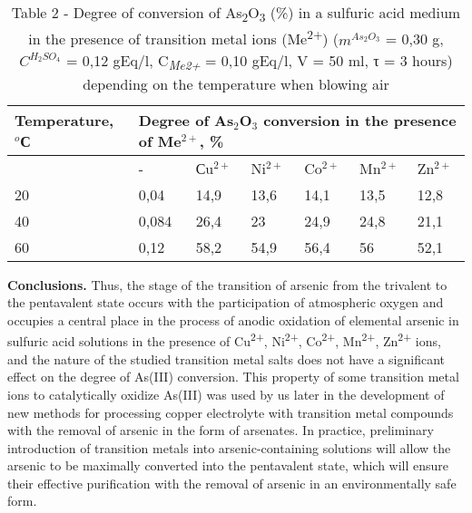 \begin{table}[H]
\caption*{Table 2 - Degree of conversion of
As\textsubscript{2}O\textsubscript{3} (\%) in a sulfuric acid medium
in the presence of transition metal ions (Me\textsuperscript{2+})
($m^{As_2O_3}$ = 0,30 g, $C^{H_2SO_4}$ = 0,12 gEq/l,
C\emph{\textsubscript{Me2+}} = 0,10 gEq/l, V = 50 ml, τ = 3 hours)
depending on the temperature when blowing air}
\centering
\begin{tabular}{|l|llllll|}
\hline
Temperature, $^o$С & \multicolumn{6}{l|}{Degree of As$_2$O$_3$ conversion in the presence of Me$^{2+}$, \%} \\ \hline
   & \multicolumn{1}{l|}{-}     & \multicolumn{1}{l|}{Сu$^{2+}$} & \multicolumn{1}{l|}{Ni$^{2+}$} & \multicolumn{1}{l|}{Co$^{2+}$} & \multicolumn{1}{l|}{Mn$^{2+}$} & Zn$^{2+}$ \\ \hline
20 & \multicolumn{1}{l|}{0,04}  & \multicolumn{1}{l|}{14,9} & \multicolumn{1}{l|}{13,6} & \multicolumn{1}{l|}{14,1} & \multicolumn{1}{l|}{13,5} & 12,8 \\ \hline
40 & \multicolumn{1}{l|}{0,084} & \multicolumn{1}{l|}{26,4} & \multicolumn{1}{l|}{23}   & \multicolumn{1}{l|}{24,9} & \multicolumn{1}{l|}{24,8} & 21,1 \\ \hline
60 & \multicolumn{1}{l|}{0,12}  & \multicolumn{1}{l|}{58,2} & \multicolumn{1}{l|}{54,9} & \multicolumn{1}{l|}{56,4} & \multicolumn{1}{l|}{56}   & 52,1 \\ \hline
\end{tabular}
\end{table}

\begin{multicols}{2}
{\bfseries Conclusions.} Thus, the stage of the transition of arsenic from
the trivalent to the pentavalent state occurs with the participation of
atmospheric oxygen and occupies a central place in the process of anodic
oxidation of elemental arsenic in sulfuric acid solutions in the
presence of Cu\textsuperscript{2+}, Ni\textsuperscript{2+},
Co\textsuperscript{2+}, Mn\textsuperscript{2+}, Zn\textsuperscript{2+}
ions, and the nature of the studied transition metal salts does not have
a significant effect on the degree of As(III) conversion. This property
of some transition metal ions to catalytically oxidize As(III) was used
by us later in the development of new methods for processing copper
electrolyte with transition metal compounds with the removal of arsenic
in the form of arsenates. In practice, preliminary introduction of
transition metals into arsenic-containing solutions will allow the
arsenic to be maximally converted into the pentavalent state, which will
ensure their effective purification with the removal of arsenic in an
environmentally safe form.
\end{multicols}

